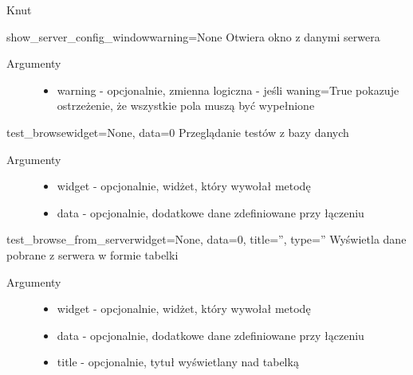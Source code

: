 \documentclass[letterpaper,10pt,polish]{manual}
\begin{document}
\begin{classdesc}{Knut}{}
\hypertarget{Knut.Knut.show\_server\_config\_window}{}\begin{methoddesc}{show\_server\_config\_window}{warning=None}
Otwiera okno z danymi serwera
\begin{description}
\item[Argumenty] \leavevmode\begin{itemize}
\item {} 
warning - opcjonalnie, zmienna logiczna - jeśli waning=True pokazuje ostrzeżenie, że wszystkie pola muszą być wypełnione

\end{itemize}

\end{description}
\end{methoddesc}

\hypertarget{Knut.Knut.test\_browse}{}\begin{methoddesc}{test\_browse}{widget=None, data=0}
Przeglądanie testów z bazy danych
\begin{description}
\item[Argumenty] \leavevmode\begin{itemize}
\item {} 
widget - opcjonalnie, widżet, który wywołał metodę

\item {} 
data  - opcjonalnie, dodatkowe dane zdefiniowane przy łączeniu

\end{itemize}

\end{description}
\end{methoddesc}

\hypertarget{Knut.Knut.test\_browse\_from\_server}{}\begin{methoddesc}{test\_browse\_from\_server}{widget=None, data=0, title='', type=''}
Wyświetla dane pobrane z serwera w formie tabelki
\begin{description}
\item[Argumenty] \leavevmode\begin{itemize}
\item {} 
widget - opcjonalnie, widżet, który wywołał metodę

\item {} 
data  - opcjonalnie, dodatkowe dane zdefiniowane przy łączeniu

\item {} 
title - opcjonalnie, tytuł wyświetlany nad tabelką


\end{itemize}
\end{description}
\end{methoddesc}
\end{classdesc}
\end{document}
